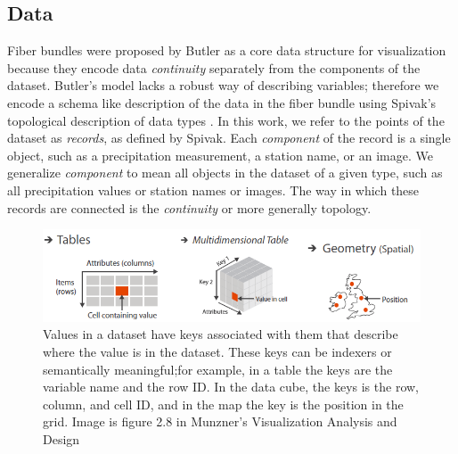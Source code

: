 \documentclass[../main.tex]{subfiles}
\begin{document}
\subsection{Data}
\label{sec:intro:data:continuity}
Fiber bundles were proposed by Butler as a core data structure for visualization because they encode data \textit{continuity} separately from the components of the dataset\cite{butlerVisualizationModelBased1989,butlerVectorBundleClassesForm1992}. Butler's model lacks a robust way of describing variables; therefore we encode a schema like description of the data in the fiber bundle using Spivak's topological description of data types \cite{spivakDatabasesAreCategories2010,spivakSIMPLICIALDATABASES}. In this work, we refer to the points of the dataset as \textit{records}, as defined by Spivak. Each \textit{component} of the record is a single object, such as a precipitation measurement, a station name, or an image. We generalize \textit{component} to mean all objects in the dataset of a given type, such as all precipitation values or station names or images. The way in which these records are connected is the \textit{continuity} or more generally topology.

\begin{figure}[H]
    \includegraphics[width=1\textwidth]{figures/intro/munzner_datatypes.png}
    \caption{Values in a dataset have keys associated with them that describe where the value is in the dataset. These keys can be indexers or semantically meaningful;for example, in a table the keys are the variable name and the row ID. In the data cube,  the keys is the row, column, and cell ID, and in the map the key is the position in the grid. Image is figure 2.8 in Munzner's Visualization Analysis and Design\cite{munznerVisualizationAnalysisDesign2014}}
    \label{fig:intro:keys:values}
\end{figure}
\end{document}

